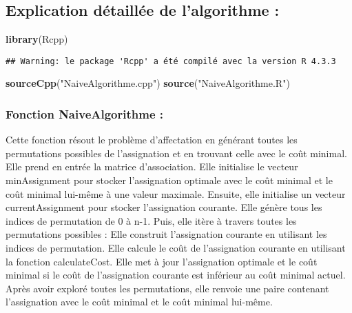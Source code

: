 \documentclass[
]{article}
\newenvironment{Shaded}{\begin{snugshade}}{\end{snugshade}}
\newcommand{\FunctionTok}[1]{\textcolor[rgb]{0.13,0.29,0.53}{\textbf{#1}}}
\newcommand{\NormalTok}[1]{#1}
\newcommand{\StringTok}[1]{\textcolor[rgb]{0.31,0.60,0.02}{#1}}
\begin{document}
\hypertarget{explication-duxe9tailluxe9e-de-lalgorithme}{%
\subsection{Explication détaillée de l'algorithme
:}\label{explication-duxe9tailluxe9e-de-lalgorithme}}

\begin{Shaded}
\begin{Highlighting}[]
\FunctionTok{library}\NormalTok{(Rcpp)}
\end{Highlighting}
\end{Shaded}

\begin{verbatim}
## Warning: le package 'Rcpp' a été compilé avec la version R 4.3.3
\end{verbatim}

\begin{Shaded}
\begin{Highlighting}[]
\FunctionTok{sourceCpp}\NormalTok{(}\StringTok{"NaiveAlgorithme.cpp"}\NormalTok{)}
\FunctionTok{source}\NormalTok{(}\StringTok{"NaiveAlgorithme.R"}\NormalTok{)}
\end{Highlighting}
\end{Shaded}

\hypertarget{fonction-naivealgorithme}{%
\subsubsection{Fonction NaiveAlgorithme
:}\label{fonction-naivealgorithme}}

Cette fonction résout le problème d'affectation en générant toutes les
permutations possibles de l'assignation et en trouvant celle avec le
coût minimal. Elle prend en entrée la matrice d'association. Elle
initialise le vecteur minAssignment pour stocker l'assignation optimale
avec le coût minimal et le coût minimal lui-même à une valeur maximale.
Ensuite, elle initialise un vecteur currentAssignment pour stocker
l'assignation courante. Elle génère tous les indices de permutation de 0
à n-1. Puis, elle itère à travers toutes les permutations possibles :
Elle construit l'assignation courante en utilisant les indices de
permutation. Elle calcule le coût de l'assignation courante en utilisant
la fonction calculateCost. Elle met à jour l'assignation optimale et le
coût minimal si le coût de l'assignation courante est inférieur au coût
minimal actuel. Après avoir exploré toutes les permutations, elle
renvoie une paire contenant l'assignation avec le coût minimal et le
coût minimal lui-même.
\end{document}
